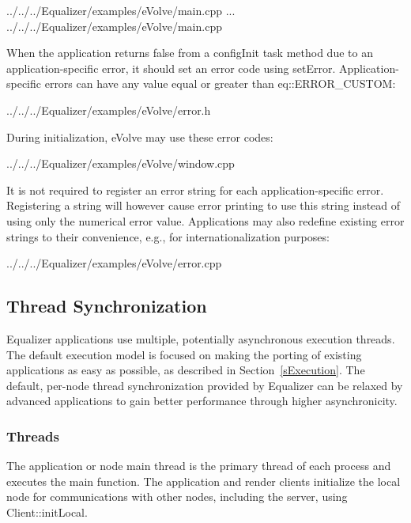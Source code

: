 \documentclass[10pt,a4]{scrartcl}
\newcommand{\sref}[1]{Section~\ref{#1}}
\begin{document}
{\footnotesize
  {../../../Equalizer/examples/eVolve/main.cpp}}
...
{\footnotesize
  {../../../Equalizer/examples/eVolve/main.cpp}}

When the application returns false from a \textsf{configInit} task method due to
an application-specific error, it should set an error code using
\textsf{setError}. Application-specific errors can have any value equal or
greater than \textsf{eq::ERROR\_CUSTOM}:

{\footnotesize
  {../../../Equalizer/examples/eVolve/error.h}}

During initialization, eVolve may use these error codes:

{\footnotesize
  {../../../Equalizer/examples/eVolve/window.cpp}}

It is not required to register an error string for each application-specific
error. Registering a string will however cause error printing to use this string
instead of using only the numerical error value. Applications may also redefine
existing error strings to their convenience, e.g., for internationalization
purposes:

{\footnotesize
  {../../../Equalizer/examples/eVolve/error.cpp}}


\subsection{\label{sThreads}Thread Synchronization}

Equalizer applications use multiple, potentially asynchronous execution
threads. The default execution model is focused on making the porting of
existing applications as easy as possible, as described in
\sref{sExecution}. The default, per-node thread synchronization provided
by Equalizer can be relaxed by advanced applications to gain better
performance through higher asynchronicity.

\subsubsection{Threads}

The application or node main thread is the primary thread of each
process and executes the \textsf{main} function. The application and
render clients initialize the local node for communications with other
nodes, including the server, using \textsf{Client::initLocal}.
\end{document}
